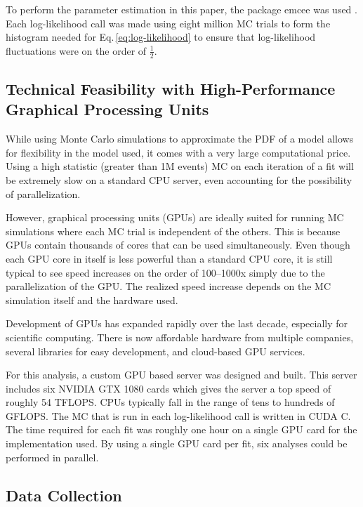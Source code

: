 \documentclass[11pt,a4paper]{article}
\newcommand\eqnref[1]{Eq.\,\ref{#1}}
\begin{document}
To perform the parameter estimation in this paper, the package emcee was used \cite{dfm}.  Each log-likelihood call was made using eight million MC trials to form the histogram needed for \eqnref{eq:log-likelihood} to ensure that log-likelihood fluctuations were on the order of $\frac{1}{2}$.


\subsection{\label{sec:level2-2}Technical Feasibility with High-Performance Graphical Processing Units}

While using Monte Carlo simulations to approximate the PDF of a model allows for flexibility in the model used, it comes with a very large computational price.  Using a high statistic (greater than 1M events) MC on each iteration of a fit will be extremely slow on a standard CPU server, even accounting for the possibility of parallelization.

However, graphical processing units (GPUs) are ideally suited for running MC simulations where each MC trial is independent of the others.  This is because GPUs contain thousands of cores that can be used simultaneously.  Even though each GPU core in itself is less powerful than a standard CPU core, it is still typical to see speed increases on the order of 100--1000x simply due to the parallelization of the GPU.  The realized speed increase depends on the MC simulation itself and the hardware used.

Development of GPUs has expanded rapidly over the last decade, especially for scientific computing.  There is now affordable hardware from multiple companies, several libraries for easy development, and cloud-based GPU services.

For this analysis, a custom GPU based server was designed and built.  This server includes six NVIDIA GTX 1080 cards which gives the server a top speed of roughly 54 TFLOPS.  CPUs typically fall in the range of tens to hundreds of GFLOPS.  The MC that is run in each log-likelihood call is written in CUDA C.  The time required for each fit was roughly one hour on a single GPU card for the implementation used.  By using a single GPU card per fit, six analyses could be performed in parallel.  


\subsection{\label{sec:level2-3}Data Collection}
\end{document}
